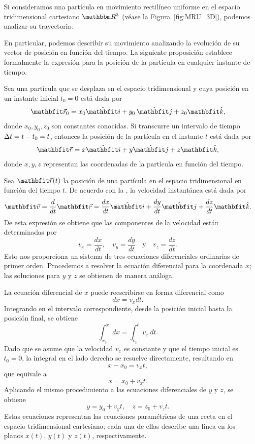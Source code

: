 Si consideramos una partícula en movimiento rectilíneo uniforme en el espacio tridimensional cartesiano $\RR[3]$ (véase la Figura~\ref{fig:MRU_3D}), podemos analizar su trayectoria.

En particular, podemos describir su movimiento analizando la evolución de su vector de posición en función del tiempo. La siguiente proposición establece formalmente la expresión para la posición de la partícula en cualquier instante de tiempo.

\begin{proposition}{}{}
    Sea una partícula que se desplaza en el espacio tridimensional y cuya posición en un instante inicial $t_0 = 0$ está dada por  
    $$\vecr_0 = x_0\veci + y_0\,\vecj + z_0\veck,$$
    donde $x_0, y_0, z_0$ son constantes conocidas. Si transcurre un intervalo de tiempo $\Delta t = t - t_0 = t$, entonces la posición de la partícula en el instante $t$ está dada por  
    $$\vecr = x\veci + y\vecj + z\veck,$$
    donde $x, y, z$ representan las coordenadas de la partícula en función del tiempo.
    \vspace{2mm}
    \begin{demo}
        Sea $\vecr(t)$ la posición de una partícula en el espacio tridimensional en función del tiempo $t$. De acuerdo con la , la velocidad instantánea está dada por
        $$\veloi = \frac{d}{dt}\vecr = \frac{dx}{dt}\veci + \frac{dy}{dt}\vecj + \frac{dz}{dt}\veck.$$
        De esta expresión se obtiene que las componentes de la velocidad están determinadas por
        $$v_x = \frac{dx}{dt}, \quad v_y = \frac{dy}{dt} \quad \text{y} \quad v_z = \frac{dz}{dt}.$$
        Esto nos proporciona un sistema de tres ecuaciones diferenciales ordinarias de primer orden. Procedemos a resolver la ecuación diferencial para la coordenada $x$; las soluciones para $y$ y $z$ se obtienen de manera análoga.
    
        La ecuación diferencial de $x$ puede reescribirse en forma diferencial como
        $$dx = v_x dt.$$
        Integrando en el intervalo correspondiente, desde la posición inicial hasta la posición final, se obtiene
        $$\int_{x_0}^{x} dx = \int_{t_0}^{t} v_x \, dt.$$
        Dado que se asume que la velocidad $v_x$ es constante y que el tiempo inicial es $t_0 = 0$, la integral en el lado derecho se resuelve directamente, resultando en
        $$x - x_0 = v_x t,$$
        que equivale a
        $$x = x_0 + v_x t.$$
        Aplicando el mismo procedimiento a las ecuaciones diferenciales de $y$ y $z$, se obtiene
        $$y = y_0 + v_y t, \quad z = z_0 + v_z t.$$
        Estas ecuaciones representan las ecuaciones paramétricas de una recta en el espacio tridimensional cartesiano; cada una de ellas describe una línea en los planos $x(t)$, $y(t)$ y $z(t)$, respectivamente.  
    

\end{demo}
\end{proposition}
